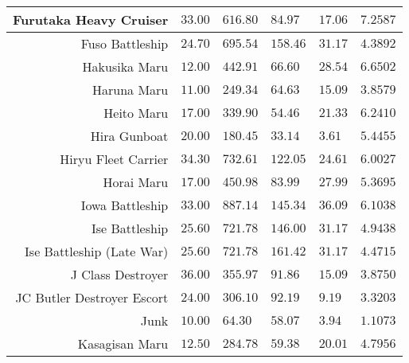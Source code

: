 \documentclass{article}
\begin{document}
\begin{tabularx}{\textwidth}{|r|l|l|l|l|X|}
\hline
Furutaka Heavy Cruiser & $33.00$ & $616.80$ & $84.97$ & $17.06$ & $7.2587$ \\
\hline
Fuso Battleship & $24.70$ & $695.54$ & $158.46$ & $31.17$ & $4.3892$ \\
\hline
Hakusika Maru & $12.00$ & $442.91$ & $66.60$ & $28.54$ & $6.6502$ \\
\hline
Haruna Maru & $11.00$ & $249.34$ & $64.63$ & $15.09$ & $3.8579$ \\
\hline
Heito Maru & $17.00$ & $339.90$ & $54.46$ & $21.33$ & $6.2410$ \\
\hline
Hira Gunboat & $20.00$ & $180.45$ & $33.14$ & $3.61$ & $5.4455$ \\
\hline
Hiryu Fleet Carrier & $34.30$ & $732.61$ & $122.05$ & $24.61$ & $6.0027$ \\
\hline
Horai Maru & $17.00$ & $450.98$ & $83.99$ & $27.99$ & $5.3695$ \\
\hline
Iowa Battleship & $33.00$ & $887.14$ & $145.34$ & $36.09$ & $6.1038$ \\
\hline
Ise Battleship & $25.60$ & $721.78$ & $146.00$ & $31.17$ & $4.9438$ \\
\hline
Ise Battleship (Late War) & $25.60$ & $721.78$ & $161.42$ & $31.17$ & $4.4715$ \\
\hline
J Class Destroyer & $36.00$ & $355.97$ & $91.86$ & $15.09$ & $3.8750$ \\
\hline
JC Butler Destroyer Escort & $24.00$ & $306.10$ & $92.19$ & $9.19$ & $3.3203$ \\
\hline
Junk & $10.00$ & $64.30$ & $58.07$ & $3.94$ & $1.1073$ \\
\hline
Kasagisan Maru & $12.50$ & $284.78$ & $59.38$ & $20.01$ & $4.7956$ \\
\hline
\end{tabularx}
\pagebreak
\end{document}
